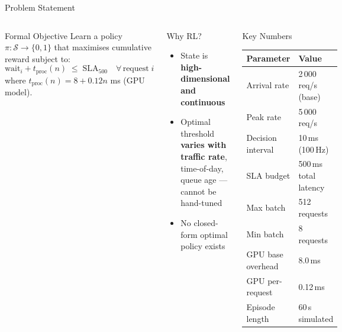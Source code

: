 \documentclass[aspectratio=169]{beamer}
\begin{document}
\begin{frame}{Problem Statement}
  \begin{columns}[T]
      \begin{block}{Formal Objective}
        Learn a policy $\pi : \mathcal{S} \to \{0,1\}$ that maximises
        cumulative reward subject to:
        \begin{equation*}
          \text{wait}_{i} + t_{\text{proc}}(n) \;\leq\; \text{SLA}_{500}
          \quad \forall\, \text{request}\; i
        \end{equation*}
        where $t_{\text{proc}}(n) = 8 + 0.12n$ ms (GPU model).
      \end{block}
      \vspace{4pt}
      \begin{block}{Why RL?}
        \begin{itemize}
          \item State is \textbf{high-dimensional and continuous}
          \item Optimal threshold \textbf{varies with traffic rate}, time-of-day,
                queue age — cannot be hand-tuned
          \item No closed-form optimal policy exists
        \end{itemize}
      \end{block}

      \begin{exampleblock}{Key Numbers}
        \renewcommand{\arraystretch}{1.3}
        \begin{tabular}{ll}
          \toprule
          \textbf{Parameter} & \textbf{Value} \\
          \midrule
          Arrival rate & 2\,000 req/s (base) \\
          Peak rate & 5\,000 req/s \\
          Decision interval & 10\,ms (100\,Hz) \\
          SLA budget & 500\,ms total latency \\
          Max batch & 512 requests \\
          Min batch & 8 requests \\
          GPU base overhead & 8.0\,ms \\
          GPU per-request & 0.12\,ms \\
          Episode length & 60\,s simulated \\
          \bottomrule
        \end{tabular}
      \end{exampleblock}
  \end{columns}
\end{frame}
\end{document}
